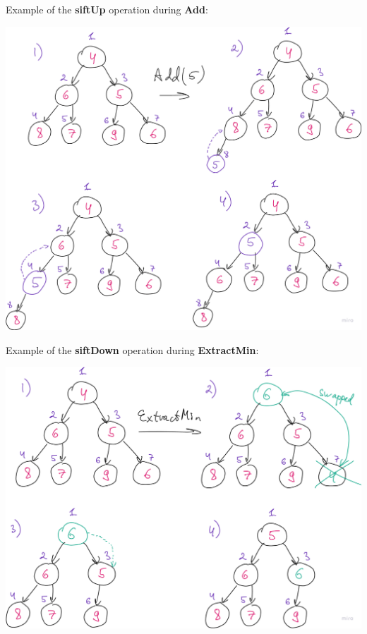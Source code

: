 Example of the \textbf{siftUp} operation during \textbf{Add}:

\begin{center}
    \includegraphics[scale=0.25]{./assets/12-binary-heap/4.png}
\end{center}

Example of the \textbf{siftDown} operation during \textbf{ExtractMin}:

\begin{center}
    \includegraphics[scale=0.25]{./assets/12-binary-heap/5.png}
\end{center}


